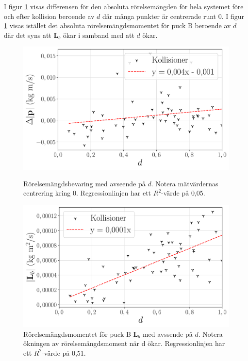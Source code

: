 I figur \ref{fig:lb-label} visas differensen för den absoluta rörelsemängden för hela systemet före och efter kollision beroende av $d$ där många punkter är centrerade runt 0. I figur \ref{fig:lb-label} visas istället det absoluta rörelsemängdsmomentet för puck B beroende av $d$ där det syns att $\mathbf{L}_b$ ökar i samband med att $d$ ökar. 
 

\begin{figure}[H]
    
    \begin{minipage}{.45\textwidth}
        \centering
        \hspace*{-1.2cm}
        \includegraphics[width=1.2\linewidth]{images/d_deltap2.pdf} %
        \caption{Rörelsemängdsbevaring med avseende på $d$. Notera mätvärdernas centrering kring 0. Regressionlinjen har ett $R^2$-värde på 0,05.}
        \label{fig:rm}
    \end{minipage} 
    \hfill
    \begin{minipage}{.45\textwidth}
        \centering
        \hspace*{-1.2cm}
        \includegraphics[width=1.2\linewidth]{images/d_lb.pdf} %
        \caption{Rörelsemängdsmomentet för puck B $\mathbf{L}_b$ med avssende på $d$. Notera ökningen av rörelsemängdsmoment när d ökar. Regressionlinjen har ett $R^2$-värde på 0,51. }
        \label{fig:lb-label}
    \end{minipage}
\end{figure}

